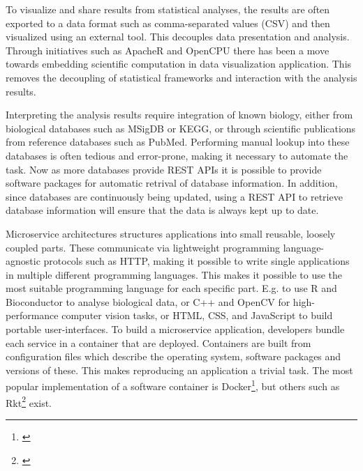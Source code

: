 
To visualize and share results from statistical analyses, the results are often
exported to a data format such as comma-separated values (CSV) and
then visualized using an external tool. This decouples data presentation and
analysis.  
Through initiatives such as ApacheR and OpenCPU there has been a move
towards embedding scientific computation in data visualization application. This
removes the decoupling of statistical frameworks and interaction with the
analysis results. 

Interpreting the analysis results require integration of known biology, either
from biological databases such as MSigDB\cite{} or KEGG\cite{}, or through
scientific publications from reference databases such as PubMed\cite{}.
Performing manual lookup into these databases is often tedious and error-prone,
making it necessary to automate the task. Now as more databases provide REST
APIs it is possible to provide software packages for automatic retrival of
database information. In addition, since databases are continuously being
updated, using a REST API to retrieve database information will ensure that the
data is always kept up to date. 



Microservice architectures structures applications into small reusable, loosely
coupled parts. These communicate via lightweight programming language-agnostic
protocols such as HTTP, making it possible to write single applications in
multiple different programming languages. This makes it possible to use the most
suitable programming language for each specific part. E.g. to use R and
Bioconductor to analyse biological data, or C++ and OpenCV for high-performance
computer vision tasks, or HTML, CSS, and JavaScript to build portable
user-interfaces. To build a microservice application, developers bundle each
service in a container that are deployed. Containers are built from
configuration files which describe the operating system, software packages and
versions of these. This makes reproducing an application a trivial task. The
most popular implementation of a software container is Docker\footnote{\url{}},
but others such as Rkt\footnote{\url{}} exist.  

